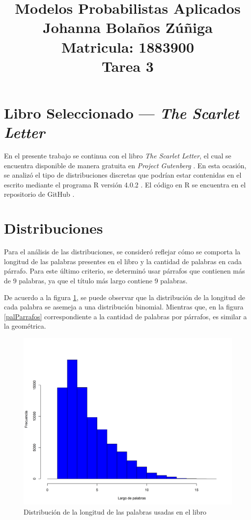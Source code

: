 \documentclass{article}
\title{
\centering
Modelos Probabilistas Aplicados \\
Johanna Bolaños Zúñiga \\
Matricula: 1883900\\
Tarea 3
}
\date{}
\begin{document}
\maketitle

\section{Libro Seleccionado --- \textit{The Scarlet Letter}}

En el presente trabajo se continua con el libro \textit{The Scarlet Letter}, el cual se encuentra disponible de manera gratuita en \textit{Project Gutenberg} \cite{libro}. En esta ocasión, se analizó el tipo de distribuciones discretas que podrían estar contenidas en el escrito mediante el programa R versión 4.0.2 \cite{r}. El código en R se encuentra en el repositorio de GitHub \cite{github}.

\section{Distribuciones}
Para el análisis de las distribuciones, se consideró reflejar cómo se comporta la longitud de las palabras presentes en el libro y la cantidad de palabras en cada párrafo. Para este último criterio, se determinó usar párrafos que contienen más de 9 palabras, ya que el título más largo contiene 9 palabras.

De acuerdo a la figura \ref{largoPalabras}, se puede observar que la distribución de la longitud de cada palabra se asemeja a una distribución binomial. Mientras que, en la figura  \ref{palParrafos} correspondiente a la cantidad de palabras por párrafos, es similar a la geométrica.



\begin{figure}
\centering
\includegraphics[scale=0.5]{Figures/largoPalabras.png}
\caption{Distribución de la longitud de las palabras usadas en el libro}
\label{largoPalabras}
\end{figure}
\end{document}
